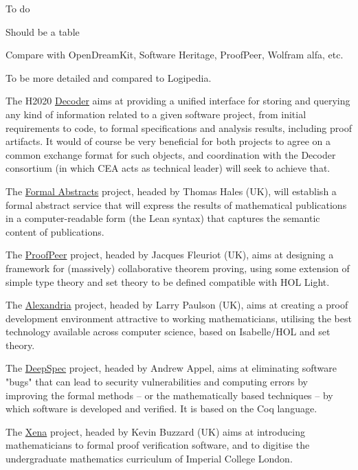 
{\color{red} To do}

{\color{red} Should be a table}

{\color{red} Compare with OpenDreamKit, Software Heritage, ProofPeer,
  Wolfram alfa, etc.}

{\color{red} To be more detailed and compared to Logipedia.}

The H2020 \href{https://www.decoder-project.eu}{Decoder} aims at
providing a unified interface for storing and querying any kind of
information related to a given software project, from initial
requirements to code, to formal specifications and analysis results,
including proof artifacts. It would of course be very beneficial for
both projects to agree on a common exchange format for such objects, and
coordination with the Decoder consortium (in which CEA acts as technical
leader) will seek to achieve that.

The \href{https://formalabstracts.github.io/}{Formal Abstracts}
project, headed by Thomas Hales (UK), will establish a formal abstract
service that will express the results of mathematical publications in
a computer-readable form (the Lean syntax) that captures the semantic
content of publications.

The \href{http://www.proofpeer.net/}{ProofPeer} project, headed by
Jacques Fleuriot (UK), aims at designing a framework for (massively)
collaborative theorem proving, using some extension of simple type
theory and set theory to be defined compatible with HOL Light.

The
\href{https://www.cl.cam.ac.uk/~lp15/Grants/Alexandria/}{Alexandria}
project, headed by Larry Paulson (UK), aims at creating a proof
development environment attractive to working mathematicians,
utilising the best technology available across computer science, based
on Isabelle/HOL and set theory.

The \href{https://deepspec.org/}{DeepSpec} project, headed by Andrew
Appel, aims at eliminating software "bugs" that can lead to security
vulnerabilities and computing errors by improving the formal methods
-- or the mathematically based techniques -- by which software is
developed and verified. It is based on the Coq language.

The \href{https://xenaproject.wordpress.com/}{Xena} project, headed by
Kevin Buzzard (UK) aims at introducing mathematicians to formal proof
verification software, and to digitise the undergraduate mathematics
curriculum of Imperial College London.


